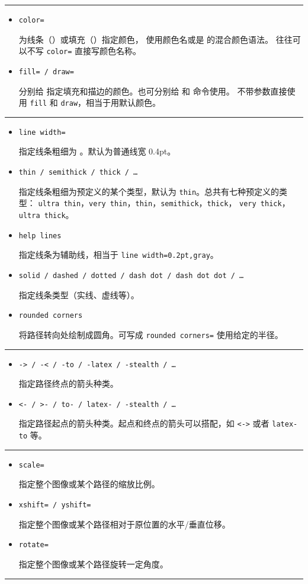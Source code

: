 \begin{table}[htp]
\caption{\TikZ\ 常用的一些绘图参数。}\label{tbl:tikz-options}
\small
\hrule
\begin{itemize}
  \item \texttt{color=} \par
  为线条（）或填充（）指定颜色， 使用颜色名或是  的混合颜色语法。
  往往可以不写 \texttt{color=} 直接写颜色名称。
  \item \texttt{fill= / draw=} \par
  分别给  指定填充和描边的颜色。也可分别给  和  命令使用。
  不带参数直接使用 \texttt{fill} 和 \texttt{draw}，相当于用默认颜色。
\end{itemize}
\hrule
\begin{itemize}
  \item \texttt{line width=} \par
  指定线条粗细为 。默认为普通线宽 0.4pt。
  \item \texttt{thin / semithick / thick / \ldots} \par
  指定线条粗细为预定义的某个类型，默认为 \texttt{thin}。总共有七种预定义的类型：
  \texttt{ultra thin}，\texttt{very thin}，\texttt{thin}，\texttt{semithick}，\texttt{thick}，
  \texttt{very thick}，\texttt{ultra thick}。
  \item \texttt{help lines} \par
  指定线条为辅助线，相当于 \texttt{line width=0.2pt,gray}。
  \item \texttt{solid / dashed / dotted / dash dot / dash dot dot / \dots} \par
  指定线条类型（实线、虚线等）。
  \item \texttt{rounded corners} \par
  将路径转向处绘制成圆角。可写成 \texttt{rounded corners=} 使用给定的半径。
\end{itemize}
\hrule
\begin{itemize}
  \item \texttt{-> / -< / -to / -latex / -stealth / \ldots} \par
  指定路径终点的箭头种类。
  \item \texttt{<- / >- / to- / latex- / -stealth / \ldots} \par
  指定路径起点的箭头种类。起点和终点的箭头可以搭配，如 \texttt{<->} 或者 \texttt{latex-to} 等。
\end{itemize}
\hrule
\begin{itemize}
  \item \texttt{scale=} \par
  指定整个图像或某个路径的缩放比例。
  \item \texttt{xshift= / yshift=} \par
  指定整个图像或某个路径相对于原位置的水平/垂直位移。
  \item \texttt{rotate=} \par
  指定整个图像或某个路径旋转一定角度。
\end{itemize}
\hrule
\end{table}

